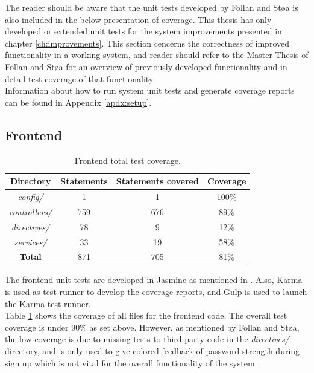 The reader should be aware that the unit tests developed by Follan and Støa is also included in the below presentation of coverage. This thesis has only developed or extended unit tests for the system improvements presented in chapter \ref{ch:improvements}. This section cencerns the correctness of improved functionality in a working system, and reader should refer to the Master Thesis of Follan and Støa for an overview of previously developed functionality and in detail test coverage of that functionality.  \\

Information about how to run system unit tests and generate coverage reports can be found in Appendix \ref{apdx:setup}.

\subsection{Frontend}
\begin{table}[h!]
    \centering
    \begin{tabular}{c c c c}
      \hline
      \textbf{Directory} & \textbf{Statements} & \textbf{Statements covered} & \textbf{Coverage} \\ \hline
      \textit{config/} & 1 & 1 & 100\% \\
      \textit{controllers/} & 759 & 676 & 89\% \\
      \textit{directives/} & 78 & 9 & 12\% \\
      \textit{services/} & 33 & 19 & 58\% \\ \hline
      \textbf{Total} & 871 & 705 & 81\% \\ \hline
    \end{tabular}
    \caption{Frontend total test coverage.}
    \label{tab:frontend-coverage-all}
\end{table}

The frontend unit tests are developed in Jasmine \cite{JASMINE} as mentioned in . Also, Karma \cite{KARMA} is used as test runner to develop the coverage reports, and Gulp \cite{GULP} is used to launch the Karma test runner.  \\

Table \ref{tab:frontend-coverage-all} shows the coverage of all files for the frontend code. The overall test coverage is under 90\% as set above. However, as mentioned by Follan and Støa, the low coverage is due to missing tests to third-party code in the \textit{directives/} directory, and is only used to give colored feedback of password strength during sign up which is not vital for the overall functionality of the system. \\

